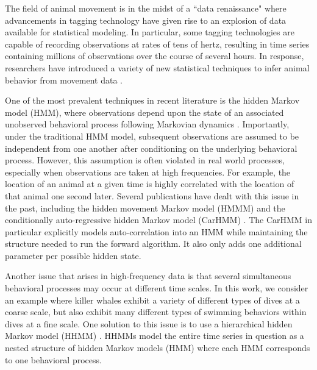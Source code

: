 

The field of animal movement is in the midst of a ``data renaissance" where advancements in tagging technology have given rise to an explosion of data available for statistical modeling. In particular, some tagging technologies are capable of recording observations at rates of tens of hertz, resulting in time series containing millions of observations over the course of several hours. In response, researchers have introduced a variety of new statistical techniques to infer animal behavior from movement data \citep{Hooten:2017}. 

One of the most prevalent techniques in recent literature is the hidden Markov model (HMM), where observations depend upon the state of an associated unobserved behavioral process following Markovian dynamics \citep{Patterson:2017}. Importantly, under the traditional HMM model, subsequent observations are assumed to be independent from one another after conditioning on the underlying behavioral process. However, this assumption is often violated in real world processes, especially when observations are taken at high frequencies. For example, the location of an animal at a given time is highly correlated with the location of that animal one second later. Several publications have dealt with this issue in the past, including the hidden movement Markov model (HMMM) \citep{Whoriskey:2016} and the conditionally auto-regressive hidden Markov model (CarHMM) \citep{Lawler:2019}. The CarHMM in particular explicitly models auto-correlation into an HMM while maintaining the structure needed to run the forward algorithm. It also only adds one additional parameter per possible hidden state.

Another issue that arises in high-frequency data is that several simultaneous behavioral processes may occur at different time scales. In this work, we consider an example where killer whales exhibit a variety of different types of dives at a coarse scale, but also exhibit many different types of swimming behaviors within dives at a fine scale. One solution to this issue is to use a hierarchical hidden Markov model (HHMM) \citep{Barajas:2017,Adam:2019}. HHMMs model the entire time series in question as a nested structure of hidden Markov models (HMM) where each HMM corresponds to one behavioral process.

